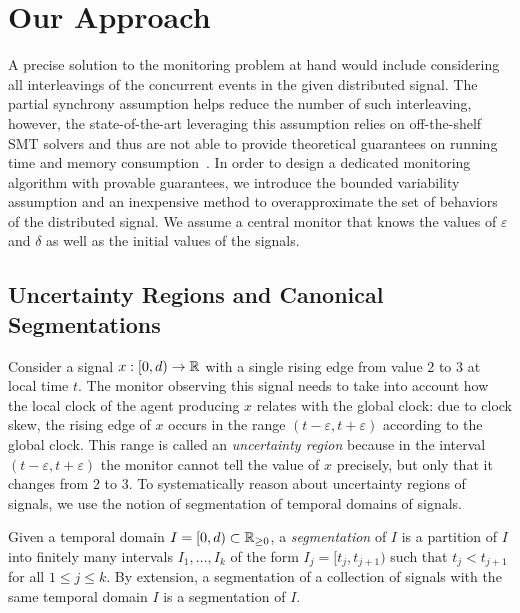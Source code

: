 \section{Our Approach}

A precise solution to the monitoring problem at hand would include considering all interleavings of the concurrent events in the given distributed signal.
The partial synchrony assumption helps reduce the number of such interleaving, however, the state-of-the-art leveraging this assumption relies on off-the-shelf SMT solvers and thus are not able to provide theoretical guarantees on running time and memory consumption~\cite{GangulyMB20,MomtazAB23}.
In order to design a dedicated monitoring algorithm with provable guarantees, we introduce the bounded variability assumption and an inexpensive method to overapproximate the set of behaviors of the distributed signal.
We assume a central monitor that knows the values of $\varepsilon$ and $\delta$ as well as the initial values of the signals.


\subsection{Uncertainty Regions and Canonical Segmentations} \label{sec:segment}

Consider a signal $x : [0,d) \to \mathbb{R}$ with a single rising edge from value 2 to 3 at local time $t$.
The monitor observing this signal needs to take into account how the local clock of the agent producing $x$ relates with the global clock: due to clock skew, the rising edge of $x$ occurs in the range $(t - \varepsilon, t + \varepsilon)$ according to the global clock.
This range is called an \emph{uncertainty region} because in the interval $(t - \varepsilon, t + \varepsilon)$ the monitor cannot tell the value of $x$ precisely, but only that it changes from 2 to 3.
To systematically reason about uncertainty regions of signals, we use the notion of segmentation of temporal domains of signals.

Given a temporal domain $I = [0,d) \subset \mathbb{R}_{\geq 0}$, a \emph{segmentation} of $I$ is a partition of $I$ into finitely many intervals $I_1, \ldots, I_k$ of the form $I_j = [t_j, t_{j+1})$ such that $t_j < t_{j+1}$ for all $1 \leq j \leq k$.
By extension, a segmentation of a collection of signals with the same temporal domain $I$ is a segmentation of $I$.

